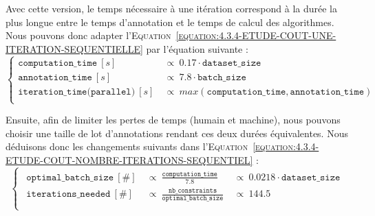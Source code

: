 			Avec cette version, le temps nécessaire à une itération correspond à la durée la plus longue entre le temps d'annotation et le temps de calcul des algorithmes.
			Nous pouvons donc adapter l'\textsc{Equation~\ref{equation:4.3.4-ETUDE-COUT-UNE-ITERATION-SEQUENTIELLE}} par l'équation suivante :
			\begin{equation}
				\label{equation:4.3.4-ETUDE-COUT-UNE-ITERATION-PARALLELE}
				\begin{cases}
					\texttt{computation\_time}~[s]&
						~\propto~0.17 \cdot \texttt{dataset\_size}\\
					\texttt{annotation\_time}~[s]&
						~\propto~7.8 \cdot \texttt{batch\_size} \\
					\texttt{iteration\_time(parallel)}~[s]&
						~\propto~max(\texttt{computation\_time}, \texttt{annotation\_time}) \\
				\end{cases}
			\end{equation}
			
			Ensuite, afin de limiter les pertes de temps (humain et machine), nous pouvons choisir une taille de lot d'annotations rendant ces deux durées équivalentes.
			Nous déduisons donc les changements suivants dans l'\textsc{Equation~\ref{equation:4.3.4-ETUDE-COUT-NOMBRE-ITERATIONS-SEQUENTIEL}} :
			\begin{equation}
				\label{equation:4.3.4-ETUDE-COUT-NOMBRE-ITERATIONS-PARALLELE}
				\begin{cases}
				\begin{aligned}
					\texttt{optimal\_batch\_size}~[\#]&
						~\propto~\frac{\texttt{computation\_time}}{7.8}&
						~\propto~0.0218 \cdot \texttt{dataset\_size} \\
					\texttt{iterations\_needed}~[\#] &
						~\propto~\frac{\texttt{nb\_constraints}}{\texttt{optimal\_batch\_size}}&
						~\propto~144.5 \\
				\end{aligned}
				\end{cases}
			\end{equation}
			
